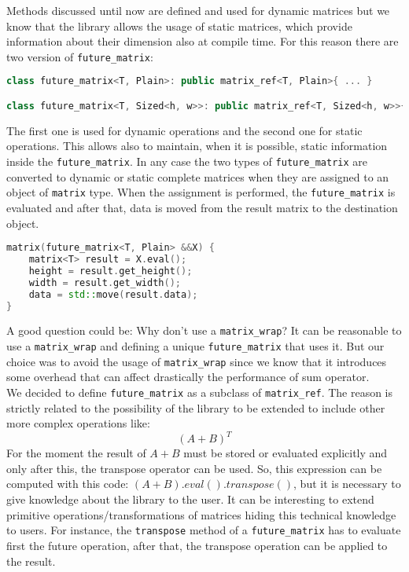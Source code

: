 \documentclass[10pt,a4paper]{article}
\begin{document}
Methods discussed until now are defined and used for dynamic matrices but we know that the library allows the usage of static matrices, which provide information about their dimension also at compile time. For this reason there are two version of \verb|future_matrix|:
\begin{lstlisting}[language=C++]
class future_matrix<T, Plain>: public matrix_ref<T, Plain>{ ... }

class future_matrix<T, Sized<h, w>>: public matrix_ref<T, Sized<h, w>>{ ... }
\end{lstlisting}
The first one is used for dynamic operations and the second one for static operations. This allows also to maintain, when it is possible, static information inside the \verb|future_matrix|. In any case the two types of \verb|future_matrix| are converted to dynamic or static complete matrices when they are assigned to an object of \verb|matrix| type. When the assignment is performed, the \verb|future_matrix| is evaluated and after that, data is moved from the result matrix to the destination object.
\begin{lstlisting}[language=C++]
matrix(future_matrix<T, Plain> &&X) {
	matrix<T> result = X.eval();
	height = result.get_height();
	width = result.get_width();
	data = std::move(result.data);
}
\end{lstlisting}

A good question could be: Why don't use a \verb|matrix_wrap|?
It can be reasonable to use a \verb|matrix_wrap| and defining a unique \verb|future_matrix| that uses it. But our choice was to avoid the usage of \verb|matrix_wrap| since we know that it introduces some overhead that can affect drastically the performance of sum operator.  \\

We decided to define \verb|future_matrix| as a subclass of \verb|matrix_ref|. The reason is strictly related to the possibility of the library to be extended to include other more complex operations like:
$$(A+B)^T$$
For the moment the result of $A+B$ must be stored or evaluated explicitly and only after this, the transpose operator can be used. So, this expression can be computed with this code: $(A+B).eval().transpose()$, but it is necessary to give knowledge about the library to the user. It can be interesting to extend primitive operations/transformations of matrices hiding this technical knowledge to users. For instance, the \verb|transpose| method of a \verb|future_matrix| has to evaluate first the future operation, after that, the transpose operation can be applied to the result.\\
\end{document}
